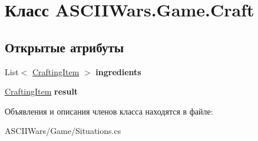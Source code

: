 \hypertarget{class_a_s_c_i_i_wars_1_1_game_1_1_craft}{}\section{Класс A\+S\+C\+I\+I\+Wars.\+Game.\+Craft}
\label{class_a_s_c_i_i_wars_1_1_game_1_1_craft}
\subsection*{Открытые атрибуты}
\begin{DoxyCompactItemize}
\item 
\hypertarget{class_a_s_c_i_i_wars_1_1_game_1_1_craft_aece38d819ddd8edebf172db5bdd1f13b}{}\label{class_a_s_c_i_i_wars_1_1_game_1_1_craft_aece38d819ddd8edebf172db5bdd1f13b} 
List$<$ \hyperlink{class_a_s_c_i_i_wars_1_1_game_1_1_crafting_item}{Crafting\+Item} $>$ {\bfseries ingredients}
\item 
\hypertarget{class_a_s_c_i_i_wars_1_1_game_1_1_craft_ae7a24959d740187fde0bf8df00691522}{}\label{class_a_s_c_i_i_wars_1_1_game_1_1_craft_ae7a24959d740187fde0bf8df00691522} 
\hyperlink{class_a_s_c_i_i_wars_1_1_game_1_1_crafting_item}{Crafting\+Item} {\bfseries result}
\end{DoxyCompactItemize}


Объявления и описания членов класса находятся в файле\+:\begin{DoxyCompactItemize}
\item 
A\+S\+C\+I\+I\+Wars/\+Game/Situations.\+cs\end{DoxyCompactItemize}
